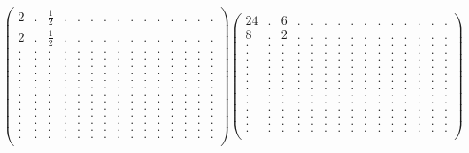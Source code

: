 \documentclass[12pt,a4paper]{amsart}
\begin{document}
\begin{align*}
\left(\begin{array}{rrrrrrrrrrrrrrr}%
2&.&\frac12&.&.&.&.&.&.&.&.&.&.&.&.\\%
2&.&\frac12&.&.&.&.&.&.&.&.&.&.&.&.\\%
.&.&.&.&.&.&.&.&.&.&.&.&.&.&.\\%
.&.&.&.&.&.&.&.&.&.&.&.&.&.&.\\%
.&.&.&.&.&.&.&.&.&.&.&.&.&.&.\\%
.&.&.&.&.&.&.&.&.&.&.&.&.&.&.\\%
.&.&.&.&.&.&.&.&.&.&.&.&.&.&.\\%
.&.&.&.&.&.&.&.&.&.&.&.&.&.&.\\%
.&.&.&.&.&.&.&.&.&.&.&.&.&.&.\\%
.&.&.&.&.&.&.&.&.&.&.&.&.&.&.\\%
.&.&.&.&.&.&.&.&.&.&.&.&.&.&.\\%
.&.&.&.&.&.&.&.&.&.&.&.&.&.&.\\%
.&.&.&.&.&.&.&.&.&.&.&.&.&.&.\\%
.&.&.&.&.&.&.&.&.&.&.&.&.&.&.\\%
.&.&.&.&.&.&.&.&.&.&.&.&.&.&.\\%
\end{array}\right)%
\left(\begin{array}{rrrrrrrrrrrrrrr}%
24&.&6&.&.&.&.&.&.&.&.&.&.&.&.\\%
8&.&2&.&.&.&.&.&.&.&.&.&.&.&.\\%
.&.&.&.&.&.&.&.&.&.&.&.&.&.&.\\%
.&.&.&.&.&.&.&.&.&.&.&.&.&.&.\\%
.&.&.&.&.&.&.&.&.&.&.&.&.&.&.\\%
.&.&.&.&.&.&.&.&.&.&.&.&.&.&.\\%
.&.&.&.&.&.&.&.&.&.&.&.&.&.&.\\%
.&.&.&.&.&.&.&.&.&.&.&.&.&.&.\\%
.&.&.&.&.&.&.&.&.&.&.&.&.&.&.\\%
.&.&.&.&.&.&.&.&.&.&.&.&.&.&.\\%
.&.&.&.&.&.&.&.&.&.&.&.&.&.&.\\%
.&.&.&.&.&.&.&.&.&.&.&.&.&.&.\\%
.&.&.&.&.&.&.&.&.&.&.&.&.&.&.\\%
.&.&.&.&.&.&.&.&.&.&.&.&.&.&.\\%
.&.&.&.&.&.&.&.&.&.&.&.&.&.&.\\%
\end{array}\right)%
\end{align*}
\end{document}
